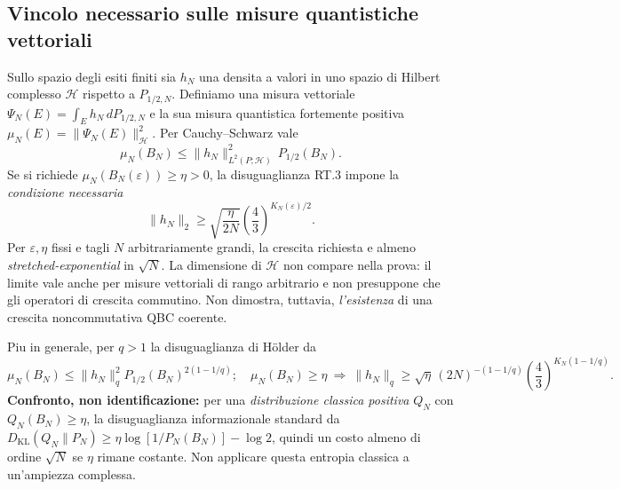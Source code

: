 \documentclass[11pt,a4paper]{article}
\begin{document}
\subsection*{Vincolo necessario sulle misure quantistiche vettoriali}
Sullo spazio degli esiti finiti sia $h_N$ una densita a valori in uno spazio di Hilbert complesso $\mathcal H$ rispetto a $P_{1/2,N}$. Definiamo una misura vettoriale $\Psi_N(E)=\int_Eh_N\,dP_{1/2,N}$ e la sua misura quantistica fortemente positiva $\mu_N(E)=\|\Psi_N(E)\|_{\mathcal H}^2$. Per Cauchy--Schwarz vale
\begin{equation}
\mu_N(B_N)\le\|h_N\|_{L^2(P;\mathcal H)}^2\,P_{1/2}(B_N).\tag{RT.4}
\end{equation}
Se si richiede $\mu_N(B_N(\varepsilon))\ge\eta>0$, la disuguaglianza RT.3 impone la \emph{condizione necessaria}
\begin{equation}
\boxed{\ \|h_N\|_{2}\ge\sqrt{\frac{\eta}{2N}}
\left(\frac43\right)^{K_N(\varepsilon)/2}.\ }\tag{RT.5}
\end{equation}
Per $\varepsilon,\eta$ fissi e tagli $N$ arbitrariamente grandi, la crescita richiesta e almeno \emph{stretched-exponential} in $\sqrt N$. La dimensione di $\mathcal H$ non compare nella prova: il limite vale anche per misure vettoriali di rango arbitrario e non presuppone che gli operatori di crescita commutino. Non dimostra, tuttavia, \emph{l'esistenza} di una crescita noncommutativa QBC coerente.

Piu in generale, per $q>1$ la disuguaglianza di H\"older da
\begin{equation}
 \mu_N(B_N)\le\|h_N\|_q^2P_{1/2}(B_N)^{2(1-1/q)};
 \quad \mu_N(B_N)\ge\eta\ \Longrightarrow\ 
 \|h_N\|_q\ge\sqrt\eta\,(2N)^{-(1-1/q)}
 \left(\frac43\right)^{K_N(1-1/q)}.\tag{RT.6}
\end{equation}
\textbf{Confronto, non identificazione:} per una \emph{distribuzione classica positiva} $Q_N$ con $Q_N(B_N)\ge\eta$, la disuguaglianza informazionale standard da $D_{\mathrm{KL}}(Q_N\|P_N)\ge\eta\log[1/P_N(B_N)]-\log2$, quindi un costo almeno di ordine $\sqrt N$ se $\eta$ rimane costante. Non applicare questa entropia classica a un'ampiezza complessa.

\clearpage
\end{document}
